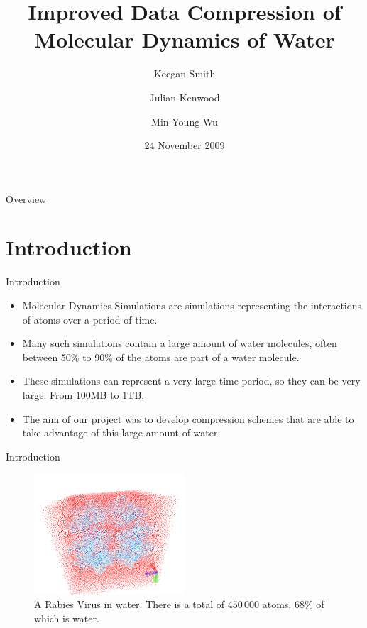 \documentclass{beamer}
\title[Water Compression]{Improved Data Compression of Molecular Dynamics of
  Water}
\author{Keegan Smith
  \and Julian Kenwood
  \and Min-Young Wu}
\date{24 November 2009}
\institute[UCT]{Department of Computer Science \\ University of Cape Town}
\begin{document}
\begin{frame}
  \titlepage
\end{frame}


\begin{frame}{Overview}
  \tableofcontents
\end{frame}


\section{Introduction}
\begin{frame}{Introduction}
  \begin{itemize}
  \item Molecular Dynamics Simulations are simulations representing the
    interactions of atoms over a period of time.

  \item Many such simulations contain a large amount of water molecules, often
    between 50\% to 90\% of the atoms are part of a water molecule.

  \item These simulations can represent a very large time period, so they can
    be very large: From $100$MB to $1$TB.

  \item The aim of our project was to develop compression schemes that are
    able to take advantage of this large amount of water.
  \end{itemize}
\end{frame}


\begin{frame}{Introduction}
  \begin{figure}
    \includegraphics[width=0.5\textwidth]{julian-images/rabies.png}
    \caption{A Rabies Virus in water. There is a total of $450\,000$ atoms,
      68\% of which is water.}
  \end{figure}
\end{frame}
\end{document}
